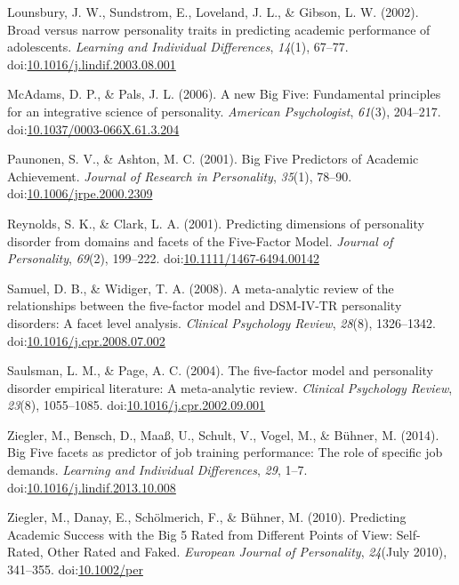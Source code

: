 \documentclass[man]{apa6}
\theoremstyle{definition}
\theoremstyle{definition}
\theoremstyle{definition}
\theoremstyle{remark}
\begin{document}
\leavevmode\hypertarget{ref-Lounsbury2002}{}%
Lounsbury, J. W., Sundstrom, E., Loveland, J. L., \& Gibson, L. W.
(2002). Broad versus narrow personality traits in predicting academic
performance of adolescents. \emph{Learning and Individual Differences},
\emph{14}(1), 67--77.
doi:\href{https://doi.org/10.1016/j.lindif.2003.08.001}{10.1016/j.lindif.2003.08.001}

\leavevmode\hypertarget{ref-McAdams2006a}{}%
McAdams, D. P., \& Pals, J. L. (2006). A new Big Five: Fundamental
principles for an integrative science of personality. \emph{American
Psychologist}, \emph{61}(3), 204--217.
doi:\href{https://doi.org/10.1037/0003-066X.61.3.204}{10.1037/0003-066X.61.3.204}

\leavevmode\hypertarget{ref-Paunonen2001}{}%
Paunonen, S. V., \& Ashton, M. C. (2001). Big Five Predictors of
Academic Achievement. \emph{Journal of Research in Personality},
\emph{35}(1), 78--90.
doi:\href{https://doi.org/10.1006/jrpe.2000.2309}{10.1006/jrpe.2000.2309}

\leavevmode\hypertarget{ref-ClarkReynolds2001}{}%
Reynolds, S. K., \& Clark, L. A. (2001). Predicting dimensions of
personality disorder from domains and facets of the Five-Factor Model.
\emph{Journal of Personality}, \emph{69}(2), 199--222.
doi:\href{https://doi.org/10.1111/1467-6494.00142}{10.1111/1467-6494.00142}

\leavevmode\hypertarget{ref-SamuelWidiger2008}{}%
Samuel, D. B., \& Widiger, T. A. (2008). A meta-analytic review of the
relationships between the five-factor model and DSM-IV-TR personality
disorders: A facet level analysis. \emph{Clinical Psychology Review},
\emph{28}(8), 1326--1342.
doi:\href{https://doi.org/10.1016/j.cpr.2008.07.002}{10.1016/j.cpr.2008.07.002}

\leavevmode\hypertarget{ref-SaulsmanPage2004}{}%
Saulsman, L. M., \& Page, A. C. (2004). The five-factor model and
personality disorder empirical literature: A meta-analytic review.
\emph{Clinical Psychology Review}, \emph{23}(8), 1055--1085.
doi:\href{https://doi.org/10.1016/j.cpr.2002.09.001}{10.1016/j.cpr.2002.09.001}

\leavevmode\hypertarget{ref-Ziegler2014}{}%
Ziegler, M., Bensch, D., Maaß, U., Schult, V., Vogel, M., \& Bühner, M.
(2014). Big Five facets as predictor of job training performance: The
role of specific job demands. \emph{Learning and Individual
Differences}, \emph{29}, 1--7.
doi:\href{https://doi.org/10.1016/j.lindif.2013.10.008}{10.1016/j.lindif.2013.10.008}

\leavevmode\hypertarget{ref-Ziegler2010}{}%
Ziegler, M., Danay, E., Schölmerich, F., \& Bühner, M. (2010).
Predicting Academic Success with the Big 5 Rated from Different Points
of View: Self-Rated, Other Rated and Faked. \emph{European Journal of
Personality}, \emph{24}(July 2010), 341--355.
doi:\href{https://doi.org/10.1002/per}{10.1002/per}

\endgroup
\end{document}
